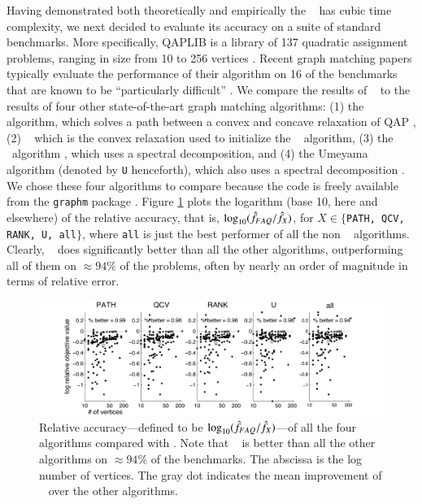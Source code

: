 \documentclass[preprint,11pt]{elsarticle}
\begin{document}
Having demonstrated both theoretically and empirically the \FAQ~ has cubic time complexity, we next decided to evaluate its accuracy on a suite of standard benchmarks.  More specifically, QAPLIB is a library of 137 quadratic assignment problems, ranging in size from 10 to 256 vertices \cite{Burkard1997}.  Recent graph matching papers typically evaluate the performance of their algorithm on 16 of the benchmarks that are known to be ``particularly difficult'' \cite{Zaslavskiy2009,Schellewald2001}.  We compare the results of \FAQ~ to the results of four other state-of-the-art graph matching algorithms: (1) the \Path~ algorithm, which solves a path between a convex and concave relaxation of QAP \cite{Zaslavskiy2009}, (2) \Qcv~ which is the convex relaxation used to initialize the \Path~ algorithm, (3) the \Rank~algorithm \cite{Singh2007}, which uses a spectral decomposition, and (4)  the Umeyama algorithm (denoted by \texttt{U} henceforth), which also uses a spectral decomposition \cite{Umeyama1988}.  We chose these four algorithms to compare because the code is freely available from the \texttt{graphm} package \cite{Zaslavskiy2009}.  
Figure \ref{fig:allRelAccuracy} plots the logarithm (base 10, here and elsewhere) of the relative accuracy, that is, $\log_{10}(\hat{f}_{FAQ}/\hat{f}_X)$, for $X \in \{$\texttt{PATH, QCV, RANK, U, all}$\}$, where \texttt{all} is just the best performer of all the non \FAQ~ algorithms.  Clearly, \FAQ~ does significantly better than all the other algorithms, outperforming all of them on $\approx 94\%$ of the problems, often by nearly an order of magnitude in terms of relative error.

\begin{figure}[htbp]
	\centering
		\includegraphics[width=1.0\linewidth]{allRelAccuracy.pdf}
	\caption{Relative accuracy---defined to be $\log_{10}(\hat{f}_{FAQ}/\hat{f}_X)$---of all the four algorithms compared with \FAQ.  Note that \FAQ~ is better than all the other algorithms on $\approx 94\%$ of the benchmarks. The abscissa is the log number of vertices.  The gray dot indicates the mean improvement of \FAQ~ over the other algorithms.}
	\label{fig:allRelAccuracy}
\end{figure}
\end{document}
